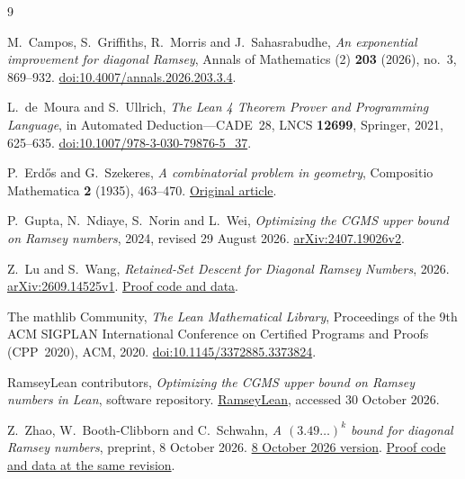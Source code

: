 \begin{thebibliography}{9}
\raggedright

M.~Campos, S.~Griffiths, R.~Morris and J.~Sahasrabudhe,
\emph{An exponential improvement for diagonal Ramsey},
Annals of Mathematics (2) \textbf{203} (2026), no.~3, 869--932.
\href{https://doi.org/10.4007/annals.2026.203.3.4}{doi:10.4007/annals.2026.203.3.4}.

L.~de~Moura and S.~Ullrich,
\emph{The Lean 4 Theorem Prover and Programming Language},
in Automated Deduction---CADE~28, LNCS \textbf{12699},
Springer, 2021, 625--635.
\href{https://doi.org/10.1007/978-3-030-79876-5_37}{doi:10.1007/978-3-030-79876-5\_37}.

P.~Erd\H{o}s and G.~Szekeres,
\emph{A combinatorial problem in geometry},
Compositio Mathematica \textbf{2} (1935), 463--470.
\href{https://www.numdam.org/item/CM_1935__2__463_0/}{Original article}.

P.~Gupta, N.~Ndiaye, S.~Norin and L.~Wei,
\emph{Optimizing the CGMS upper bound on Ramsey numbers},
2024, revised 29 August 2026.
\href{https://arxiv.org/abs/2407.19026v2}{arXiv:2407.19026v2}.

Z.~Lu and S.~Wang,
\emph{Retained-Set Descent for Diagonal Ramsey Numbers},
2026.
\href{https://arxiv.org/abs/2609.14525v1}{arXiv:2609.14525v1}.
\href{https://github.com/sichen-wang/diagonal-ramsey-numbers}{Proof code and data}.

The mathlib Community,
\emph{The Lean Mathematical Library},
Proceedings of the 9th ACM SIGPLAN International Conference on
Certified Programs and Proofs (CPP~2020), ACM, 2020.
\href{https://doi.org/10.1145/3372885.3373824}{doi:10.1145/3372885.3373824}.

RamseyLean contributors,
\emph{Optimizing the CGMS upper bound on Ramsey numbers in Lean},
software repository.
\href{https://github.com/snorin239/RamseyLean}{RamseyLean},
accessed 30 October 2026.

Z.~Zhao, W.~Booth-Clibborn and C.~Schwahn,
\emph{A $(3.49\ldots)^k$ bound for diagonal Ramsey numbers},
preprint, 8 October 2026.
\href{https://github.com/w2ll2am/diagonal-ramsey/blob/c2875f33a9d5c89f71c68f51b5767550570b5603/preprint/main.pdf}{8 October 2026 version}.
\href{https://github.com/w2ll2am/diagonal-ramsey/tree/c2875f33a9d5c89f71c68f51b5767550570b5603}{Proof code and data at the same revision}.

\end{thebibliography}

